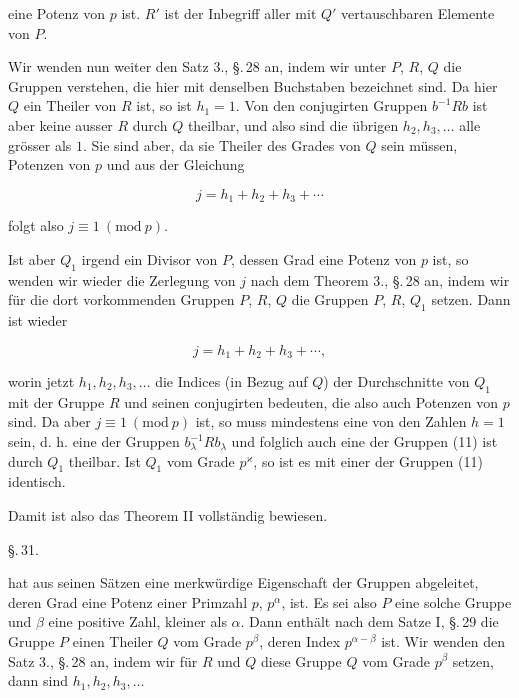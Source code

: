 eine Potenz von $p$ ist. $R'$ ist der Inbegriff aller mit $Q'$ vertauschbaren Elemente von $P$.

Wir wenden nun weiter den Satz 3., \S.\,28 an, indem wir unter $P$, $R$, $Q$ die Gruppen verstehen, die hier mit denselben Buchstaben bezeichnet sind. Da hier $Q$ ein Theiler von $R$ ist, so ist $h_1 = 1$. Von den conjugirten Gruppen $b^{-1}Rb$ ist aber keine ausser $R$ durch $Q$ theilbar, und also sind die übrigen $h_2, h_3, \ldots$ alle grösser als $1$. Sie sind aber, da sie Theiler des Grades von $Q$ sein müssen, Potenzen von $p$ und aus der Gleichung

\[
j = h_1 + h_2 + h_3 + \cdots
\]

folgt also $j \equiv 1\ (\mathrm{mod}\ p)$.

Ist aber $Q_1$ irgend ein Divisor von $P$, dessen Grad eine Potenz von $p$ ist, so wenden wir wieder die Zerlegung von $j$ nach dem Theorem 3., \S.\,28 an, indem wir für die dort vorkommenden Gruppen $P$, $R$, $Q$ die Gruppen $P$, $R$, $Q_1$ setzen. Dann ist wieder

\[
j = h_1 + h_2 + h_3 + \cdots,
\]

worin jetzt $h_1, h_2, h_3, \ldots$ die Indices (in Bezug auf $Q$) der Durchschnitte von $Q_1$ mit der Gruppe $R$ und seinen conjugirten bedeuten, die also auch Potenzen von $p$ sind. %
Da aber $j \equiv 1\ (\mathrm{mod}\ p)$ ist, so muss mindestens eine von den Zahlen $h = 1$ sein, d. h. eine der Gruppen $b_\lambda^{-1}Rb_\lambda$ und folglich auch eine der Gruppen (11) ist durch $Q_1$ theilbar. Ist $Q_1$ vom Grade $p^\varkappa$, so ist es mit einer der Gruppen (11) identisch.

Damit ist also das Theorem II vollständig bewiesen.

\begin{center}
\S.\,31.

\end{center}

 hat aus seinen Sätzen eine merkwürdige Eigenschaft der Gruppen abgeleitet, deren Grad eine Potenz einer Primzahl $p$, $p^\alpha$, ist. Es sei also $P$ eine solche Gruppe und $\beta$ eine positive Zahl, kleiner als $\alpha$. Dann enthält nach dem Satze I, \S.\,29 die Gruppe $P$ einen Theiler $Q$ vom Grade $p^\beta$, deren Index $p^{\alpha-\beta}$ ist. Wir wenden den Satz 3., \S.\,28 an, indem wir für $R$ und $Q$ diese Gruppe $Q$ vom Grade $p^\beta$ setzen, dann sind $h_1, h_2, h_3, \ldots$
